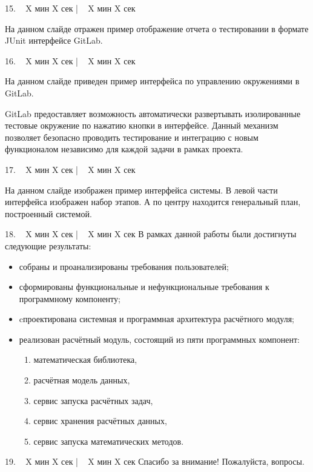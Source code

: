 \documentclass[a4paper,14pt]{extarticle}
\begin{document}
    15. ~ X мин X сек | ~ X мин X сек

    На данном слайде отражен пример отображение отчета о тестировании в формате JUnit интерфейсе GitLab.

    16. ~ X мин X сек | ~ X мин X сек

    На данном слайде приведен пример интерфейса по управлению окружениями в GitLab.

    GitLab предоставляет возможность автоматически развертывать изолированные тестовые окружение по нажатию кнопки
    в интерфейсе. Данный механизм позволяет безопасно проводить тестирование и интеграцию с новым функционалом
    независимо для каждой задачи в рамках проекта.

    17. ~ X мин X сек | ~ X мин X сек

    На данном слайде изображен пример интерфейса системы.
    В левой части интерфейса изображен набор этапов. А по центру находится генеральный план, построенный системой.

    18. ~ X мин X сек | ~ X мин X сек
    В рамках данной работы были достигнуты следующие результаты:
    \begin{itemize}
    \item собраны и проанализированы требования пользователей;
    \item сформированы функциональные и нефункциональные требования к программному компоненту;
    \item cпроектирована системная и программная архитектура расчётного модуля;
    \item {
           реализован расчётный модуль, состоящий из пяти программных компонент:
            \begin{enumerate}
                \item математическая библиотека,
                \item расчётная модель данных,
                \item сервис запуска расчётных задач,
                \item сервис хранения расчётных данных,
                \item сервис запуска математических методов.
            \end{enumerate}
    }
    \end{itemize}

    19. ~ X мин X сек | ~ X мин X сек
    Спасибо за внимание! Пожалуйста, вопросы.
\end{document}
